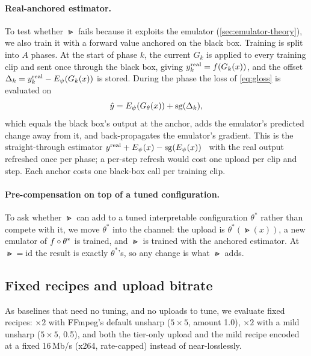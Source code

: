 \paragraph{Real-anchored estimator.}
\label{sec:anchored}
To test whether $\Gt$ fails because it exploits the emulator (\cref{sec:emulator-theory}), we also
train it with a forward value anchored on the black box. Training is split into $A$ phases. At the
start of phase $k$, the current $G_k$ is applied to every training clip and sent once through the
black box, giving $y^{\text{real}}_k=f(G_k(x))$, and the offset
$\Delta_k = y^{\text{real}}_k - E_{\psi}(G_k(x))$ is stored. During the phase the loss of \cref{eq:gloss}
is evaluated on
\begin{equation}
  \hat y = E_{\psi}(G_{\theta}(x)) + \operatorname{sg}(\Delta_k),
  \label{eq:anchored}
\end{equation}
which equals the black box's output at the anchor, adds the emulator's predicted change away from
it, and back-propagates the emulator's gradient. This is the straight-through estimator
$y^{\text{real}} + E_{\psi}(x) - \operatorname{sg}(E_{\psi}(x))$~\cite{bengio2013estimating,tian2021self,pesnel2026scaled} with the real output refreshed once per
phase; a per-step refresh would cost one upload per clip and step. Each anchor costs one black-box
call per training clip.

\paragraph{Pre-compensation on top of a tuned configuration.}
To ask whether $\Gt$ can add to a tuned interpretable configuration $\theta^\ast$ rather than compete
with it, we move $\theta^\ast$ into the channel: the upload is $\theta^\ast(\Gt(x))$, a new emulator
of $f\circ\theta^\ast$ is trained, and $\Gt$ is trained with the anchored estimator. At
$\Gt=\mathrm{id}$ the result is exactly $\theta^\ast$'s, so any change is what $\Gt$ adds.

\subsection{Fixed recipes and upload bitrate}
\label{sec:recipes}
As baselines that need no tuning, and no uploads to tune, we evaluate fixed recipes: $\times2$ with
FFmpeg's default unsharp ($5\times5$, amount 1.0), $\times2$ with a mild unsharp ($5\times5$, 0.5),
and both the tier-only upload and the mild recipe encoded at a fixed 16\,Mb/s (x264, rate-capped)
instead of near-losslessly.

